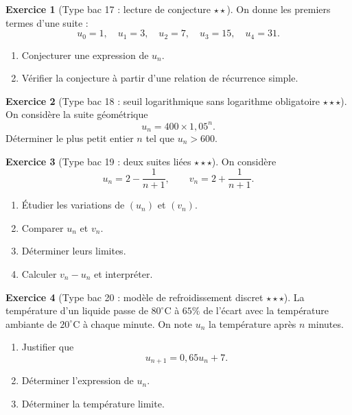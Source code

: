 \documentclass[11pt,a4paper]{article}
\theoremstyle{definition}
\newtheorem{exercice}{Exercice}[section]
\newcommand{\etoile}[1]{\hfill{\small\textbf{#1}}}
\begin{document}
\begin{exercice}[Type bac 17 : lecture de conjecture \etoile{$\star\star$}]
On donne les premiers termes d'une suite :
\[
u_0=1,\quad u_1=3,\quad u_2=7,\quad u_3=15,\quad u_4=31.
\]
\begin{enumerate}[label=\arabic*.]
    \item Conjecturer une expression de $u_n$.
    \item Vérifier la conjecture à partir d'une relation de récurrence simple.
\end{enumerate}
\end{exercice}

\begin{exercice}[Type bac 18 : seuil logarithmique sans logarithme obligatoire \etoile{$\star\star\star$}]
On considère la suite géométrique
\[
u_n=400\times 1{,}05^n.
\]
Déterminer le plus petit entier $n$ tel que $u_n>600$.
\end{exercice}

\begin{exercice}[Type bac 19 : deux suites liées \etoile{$\star\star\star$}]
On considère
\[
u_n=2-\frac1{n+1},\qquad v_n=2+\frac1{n+1}.
\]
\begin{enumerate}[label=\arabic*.]
    \item Étudier les variations de $(u_n)$ et $(v_n)$.
    \item Comparer $u_n$ et $v_n$.
    \item Déterminer leurs limites.
    \item Calculer $v_n-u_n$ et interpréter.
\end{enumerate}
\end{exercice}

\begin{exercice}[Type bac 20 : modèle de refroidissement discret \etoile{$\star\star\star$}]
La température d'un liquide passe de $80^\circ$C à $65\%$ de l'écart avec la température ambiante de $20^\circ$C à chaque minute. On note $u_n$ la température après $n$ minutes.
\begin{enumerate}[label=\arabic*.]
    \item Justifier que
    \[
    u_{n+1}=0{,}65u_n+7.
    \]
    \item Déterminer l'expression de $u_n$.
    \item Déterminer la température limite.
\end{enumerate}
\end{exercice}

\end{document}
